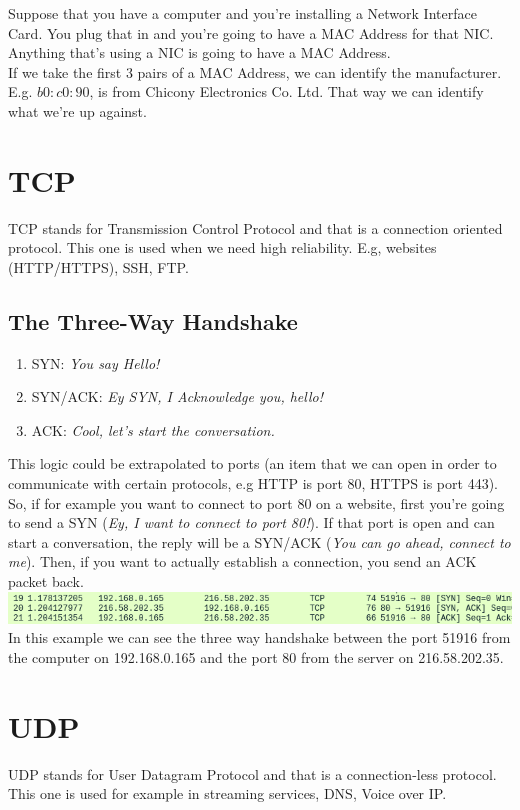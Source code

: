 \documentclass[11pt,a4paper]{article}
\begin{document}
Suppose that you have a computer and you're installing a Network Interface Card. You plug that in and you're going to have a MAC Address for that NIC. Anything that's using a NIC is going to have a MAC Address.\\

If we take the first 3 pairs of a MAC Address, we can identify the manufacturer. E.g. $b0:c0:90$, is from Chicony Electronics Co. Ltd. That way we can identify what we're up against.

\section{TCP}
TCP stands for Transmission Control Protocol and that is a connection oriented protocol. This one is used when we need high reliability. E.g, websites (HTTP/HTTPS), SSH, FTP.
\subsection{The Three-Way Handshake}
\begin{enumerate}
\item SYN: \textit{You say Hello!}
\item SYN/ACK: \textit{Ey SYN, I Acknowledge you, hello!}
\item ACK: \textit{Cool, let's start the conversation.}
\end{enumerate}
This logic could be extrapolated to ports (an item that we can open in order to communicate with certain protocols, e.g HTTP is port 80, HTTPS is port 443). So, if for example you want to connect to port 80 on a website, first you're going to send a SYN (\textit{Ey, I want to connect to port 80!}). If that port is open and can start a conversation, the reply will be a SYN/ACK (\textit{You can go ahead, connect to me}). Then, if you want to actually establish a connection, you send an ACK packet back.\\

\includegraphics[scale=.65]{Networking Refresher.ThreeWayHandshake.png} 
In this example we can see the three way handshake between the port 51916 from the computer on 192.168.0.165 and the port 80 from the server on 216.58.202.35.

\section{UDP}
UDP stands for User Datagram Protocol and that is a connection-less protocol. This one is used for example in streaming services, DNS, Voice over IP.
\end{document}
